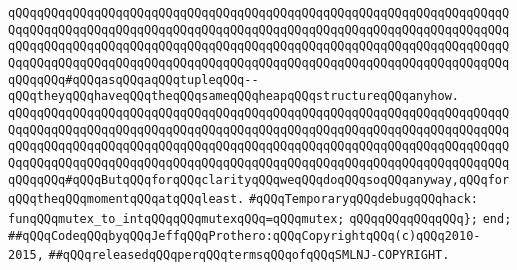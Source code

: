 \verb|qQQqqQQqqQQqqQQqqQQqqQQqqQQqqQQqqQQqqQQqqQQqqQQqqQQqqQQqqQQqqQQqqQQqqQQqqQQqqQQqqQQqqQQqqQQqqQQqqQQqqQQqqQQqqQQqqQQqqQQqqQQqqQQqqQQqqQQqqQQqqQQqqQQqqQQqqQQqqQQqqQQqqQQqqQQqqQQqqQQqqQQqqQQqqQQqqQQqqQQqqQQqqQQqqQQqqQQqqQQqqQQqqQQqqQQqqQQqqQQqqQQqqQQqqQQqqQQqqQQqqQQqqQQqqQQqqQQqqQQqqQQqqQQq#qQQqasqQQqaqQQqtupleqQQq--qQQqtheyqQQqhaveqQQqtheqQQqsameqQQqheapqQQqstructureqQQqanyhow.|\newline
\verb|qQQqqQQqqQQqqQQqqQQqqQQqqQQqqQQqqQQqqQQqqQQqqQQqqQQqqQQqqQQqqQQqqQQqqQQqqQQqqQQqqQQqqQQqqQQqqQQqqQQqqQQqqQQqqQQqqQQqqQQqqQQqqQQqqQQqqQQqqQQqqQQqqQQqqQQqqQQqqQQqqQQqqQQqqQQqqQQqqQQqqQQqqQQqqQQqqQQqqQQqqQQqqQQqqQQqqQQqqQQqqQQqqQQqqQQqqQQqqQQqqQQqqQQqqQQqqQQqqQQqqQQqqQQqqQQqqQQqqQQqqQQqqQQq#qQQqButqQQqforqQQqclarityqQQqweqQQqdoqQQqsoqQQqanyway,qQQqforqQQqtheqQQqmomentqQQqatqQQqleast.|\newline
\newline
\newline
\verb|#qQQqTemporaryqQQqdebugqQQqhack:|\newline
\verb|funqQQqmutex_to_intqQQqqQQqmutexqQQq=qQQqmutex;|\newline
\verb|qQQqqQQqqQQqqQQq};|\newline
\verb|end;|\newline
\newline
\verb|##qQQqCodeqQQqbyqQQqJeffqQQqProthero:qQQqCopyrightqQQq(c)qQQq2010-2015,|\newline
\verb|##qQQqreleasedqQQqperqQQqtermsqQQqofqQQqSMLNJ-COPYRIGHT.|\newline

